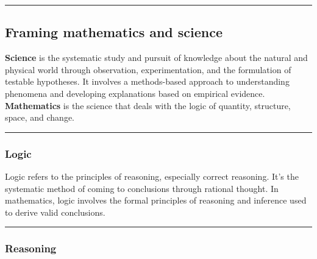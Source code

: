 \documentclass[
  letterpaper,
  DIV=11,
  numbers=noendperiod]{scrartcl}
\begin{document}
\begin{center}\rule{0.5\linewidth}{0.5pt}\end{center}

\subsection{Framing mathematics and
science}\label{framing-mathematics-and-science}

\textbf{Science} is the systematic study and pursuit of knowledge about
the natural and physical world through observation, experimentation, and
the formulation of testable hypotheses. It involves a methods-based
approach to understanding phenomena and developing explanations based on
empirical evidence. \textbf{Mathematics} is the science that deals with
the logic of quantity, structure, space, and change.

\begin{center}\rule{0.5\linewidth}{0.5pt}\end{center}

\subsubsection{Logic}\label{logic}

Logic refers to the principles of reasoning, especially correct
reasoning. It's the systematic method of coming to conclusions through
rational thought. In mathematics, logic involves the formal principles
of reasoning and inference used to derive valid conclusions.

\begin{center}\rule{0.5\linewidth}{0.5pt}\end{center}

\subsubsection{Reasoning}\label{reasoning}
\end{document}
